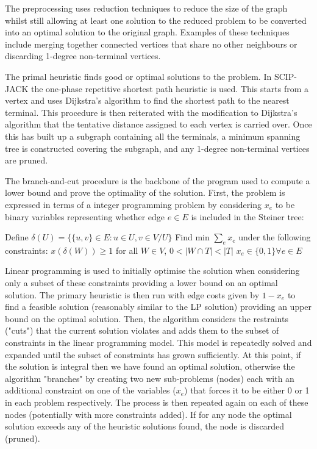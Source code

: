 \documentclass[pdftex,pra,aps,twocolumn,twoside]{revtex4-2}
\theoremstyle{plain}
\theoremstyle{note}
\newcommand\+{{\footnotesize \raisebox{0.3ex}{+}}}
\begin{document}
The preprocessing uses reduction techniques to reduce the size of the graph whilst still allowing at least one solution to the reduced problem to be converted into an optimal solution to the original graph. Examples of these techniques include merging together connected vertices that share no other neighbours or discarding 1-degree non-terminal vertices.

The primal heuristic finds good or optimal solutions to the problem. In SCIP-JACK the one-phase repetitive shortest path heuristic \cite{aragao2002implementation} is used. This starts from a vertex and uses Dijkstra’s algorithm \cite{dijkstra2022note} to find the shortest path to the nearest terminal. This procedure is then reiterated with the modification to Dijkstra’s algorithm that the tentative distance assigned to each vertex is carried over. Once this has built up a subgraph containing all the terminals, a minimum spanning tree is constructed covering the subgraph, and any 1-degree non-terminal vertices are pruned.

The branch-and-cut procedure is the backbone of the program used to compute a lower bound and prove the optimality of the solution. First, the problem is expressed in terms of a integer programming problem by considering $x_e$ to be binary variables representing whether edge $e \in E$ is included in the Steiner tree:

\begin{algorithm}
\centering
\caption*{\label{alg:steinerTreeCut}\textsc{Steiner Tree Problem Undirected Cut Formulation}}
\begin{minipage}{.4\linewidth}
\begin{algorithmic}[1]
\Statex Define $\delta (U) =\{\{u,v\} \in E: u \in U, v \in V/U \}$
\Statex
\Statex Find min $\sum_e x_e$ under the following constraints:
\State $x(\delta (W)) \geq 1$ for all $W \in V$, $0 < |W \cap T| < |T|$
\State $x_e \in \{0,1\} \forall e \in E$
\end{algorithmic}
\end{minipage}
\end{algorithm}

Linear programming is used to initially optimise the solution when considering only a subset of these constraints providing a lower bound on an optimal solution. The primary heuristic is then run with edge costs given by $1-x_e$ to find a feasible solution (reasonably similar to the LP solution) providing an upper bound on the optimal solution. Then, the algorithm considers the restraints ("cuts") that the current solution violates and adds them to the subset of constraints in the linear programming model. This model is repeatedly solved and expanded until the subset of constraints has grown sufficiently. At this point, if the solution is integral then we have found an optimal solution, otherwise the algorithm "branches" by creating two new sub-problems (nodes) each with an additional constraint on one of the variables ($x_e$) that forces it to be either 0 or 1 in each problem respectively. The process is then repeated again on each of these nodes (potentially with more constraints added). If for any node the optimal solution exceeds any of the heuristic solutions found, the node is discarded (pruned).
\newpage
\end{document}
